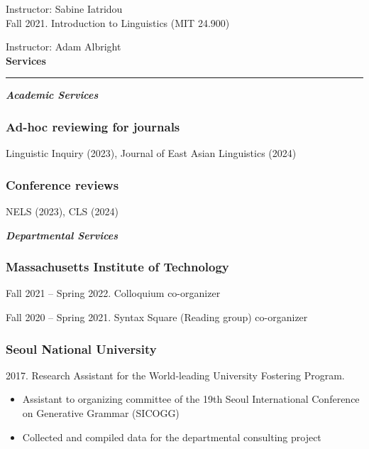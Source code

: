 \documentclass[11pt]{article}
\newcommand{\sect}[1]{{\fontsize{15}{25}\selectfont \textbf{#1}} {\vspace{0.1cm}} \hrule {\vspace{0.3cm}}}
\newcommand{\subsect}[1]{{\fontsize{12}{18}\selectfont \textit{\textbf{#1}}} {\vspace{0.3cm}}}
\begin{document}
{\hphantom{Spring 2022.}} Instructor: Sabine Iatridou\\

Fall 2021. Introduction to Linguistics (MIT 24.900)

{\hphantom{Fall 2021.}} Instructor: Adam Albright\\

\sect{Services}

\subsect{Academic Services}

\vspace{-0.75cm}

\subsubsection*{Ad-hoc reviewing for journals}

Linguistic Inquiry (2023), Journal of East Asian Linguistics (2024)

\subsubsection*{Conference reviews}

NELS (2023), CLS (2024)

\vspace{\baselineskip}

\subsect{Departmental Services}

\vspace{-0.75cm}

\subsubsection*{Massachusetts Institute of Technology}
Fall 2021 -- Spring 2022. Colloquium co-organizer

Fall 2020 -- Spring 2021. Syntax Square (Reading group) co-organizer

\subsubsection*{Seoul National University}
{2017. Research Assistant for the World-leading University Fostering Program.

\begin{itemize}[leftmargin=15pt, topsep=0pt, itemsep=0pt, parsep=0pt]
	\item{{\small Assistant to organizing committee of the 19th Seoul International Conference on Generative Grammar (SICOGG)}}
	\item{{\small Collected and compiled data for the departmental consulting project}}
\end{itemize}
}
\end{document}
